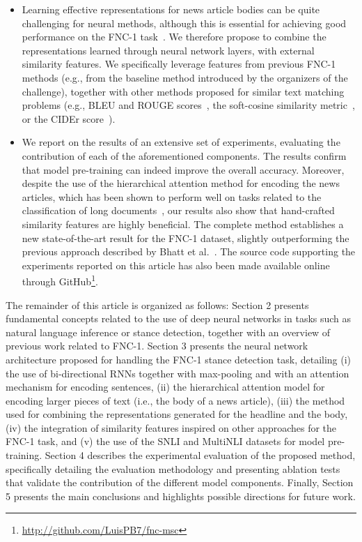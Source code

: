 \begin{itemize}
\item Learning effective representations for news article bodies can be quite challenging for neural methods, although this is essential for achieving good performance on the FNC-1 task~\cite{combination,Mohtarami2018}. We therefore propose to combine the representations learned through neural network layers, with external similarity features. We specifically leverage features from previous FNC-1 methods (e.g., from the baseline method introduced by the organizers of the challenge), together with other methods proposed for similar text matching problems (e.g., BLEU and ROUGE scores~\cite{bleu,rouge}, the soft-cosine similarity metric~\cite{charlet2017simbow}, or the CIDEr score~\cite{cider}).

\item We report on the results of an extensive set of experiments, evaluating the contribution of each of the aforementioned components. The results confirm that model pre-training can indeed improve the overall accuracy. Moreover, despite the use of the hierarchical attention method for encoding the news articles, which has been shown to perform well on tasks related to the classification of long documents~\cite{hierarchical}, our results also show that hand-crafted similarity features are highly beneficial. The complete method establishes a new state-of-the-art result for the FNC-1 dataset, slightly outperforming the previous approach described by Bhatt et al.~\cite{combination}. The source code supporting the experiments reported on this article has also been made available online through GitHub\footnote{\scriptsize{\url{http://github.com/LuisPB7/fnc-msc}}}.
\end{itemize}

The remainder of this article is organized as follows: Section 2 presents fundamental concepts related to the use of deep neural networks in tasks such as natural language inference or stance detection, together with an overview of previous work related to FNC-1. Section 3 presents the neural network architecture proposed for handling the FNC-1 stance detection task, detailing (i) the use of bi-directional RNNs together with max-pooling and with an attention mechanism for encoding sentences, (ii) the hierarchical attention model for encoding larger pieces of text (i.e., the body of a news article), (iii) the method used for combining the representations generated for the headline and the body, (iv) the integration of similarity features inspired on other approaches for the FNC-1 task, and (v) the use of the SNLI and MultiNLI datasets for model pre-training. Section 4 describes the experimental evaluation of the proposed method, specifically detailing the evaluation methodology and presenting ablation tests that validate the contribution of the different model components. Finally, Section 5 presents the main conclusions and highlights possible directions for future work.

